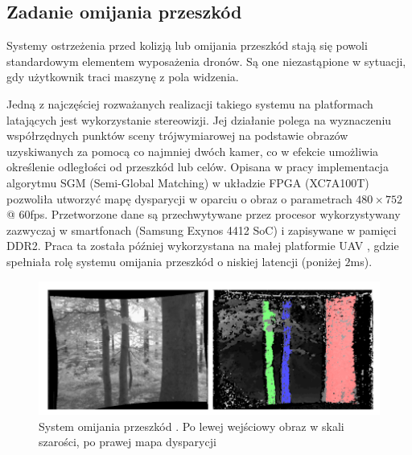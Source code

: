 \subsection{Zadanie omijania przeszkód}

Systemy ostrzeżenia przed kolizją lub omijania przeszkód stają się powoli standardowym elementem wyposażenia dronów. Są one niezastąpione w sytuacji, gdy użytkownik traci maszynę z pola widzenia. 

Jedną z najczęściej rozważanych realizacji takiego systemu na platformach latających jest wykorzystanie stereowizji. 
Jej działanie polega na wyznaczeniu współrzędnych punktów sceny trójwymiarowej na podstawie obrazów uzyskiwanych za pomocą co najmniej dwóch kamer, co w efekcie umożliwia określenie odległości od przeszkód lub celów. 
Opisana w pracy \cite{STEREOVISION} implementacja algorytmu SGM (Semi-Global Matching) w układzie FPGA (XC7A100T) pozwoliła utworzyć mapę dysparycji w oparciu o obraz o parametrach $480\times 752$ @ $60$fps. 
Przetworzone dane są przechwytywane przez procesor wykorzystywany zazwyczaj w smartfonach (Samsung Exynos 4412 SoC) i zapisywane w pamięci DDR2. 
Praca ta została później wykorzystana na małej platformie UAV \cite{STEREOVISION2}, gdzie spełniała rolę systemu omijania przeszkód o niskiej latencji (poniżej $2$ms).
\begin{figure}[h]
	\centering
	\captionsetup{justification=centering,margin=1cm}
	\includegraphics[width=13cm]{stereovision.png}
	\caption{System omijania przeszkód \cite{STEREOVISION2}. Po lewej wejściowy obraz w skali szarości, po prawej mapa dysparycji}
	\label{fig:stereovision}
\end{figure}

